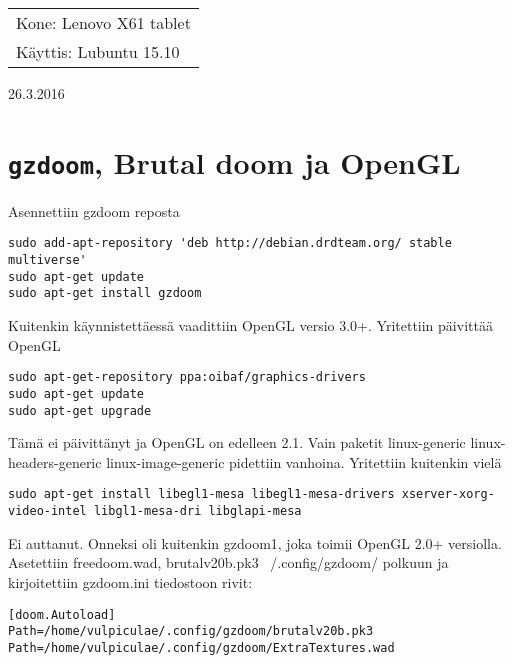 \documentclass[main.tex]{subfiles}
\begin{document}
\thispagestyle{empty}
\begin{tabular}[t]{l}
Kone: Lenovo X61 tablet\\
Käyttis: Lubuntu 15.10
\end{tabular}
\hfill 26.3.2016

\section{\texttt{gzdoom}, Brutal doom ja OpenGL}

Asennettiin gzdoom reposta

\begin{lstlisting}
sudo add-apt-repository 'deb http://debian.drdteam.org/ stable multiverse'
sudo apt-get update
sudo apt-get install gzdoom
\end{lstlisting}

Kuitenkin käynnistettäessä vaadittiin OpenGL versio 3.0+. Yritettiin päivittää OpenGL

\begin{lstlisting}
sudo apt-get-repository ppa:oibaf/graphics-drivers
sudo apt-get update
sudo apt-get upgrade
\end{lstlisting}

Tämä ei päivittänyt ja OpenGL on edelleen 2.1. Vain paketit linux-generic linux-headers-generic linux-image-generic pidettiin vanhoina. Yritettiin kuitenkin vielä

\begin{lstlisting}
sudo apt-get install libegl1-mesa libegl1-mesa-drivers xserver-xorg-video-intel libgl1-mesa-dri libglapi-mesa
\end{lstlisting}

Ei auttanut. Onneksi oli kuitenkin gzdoom1, joka toimii OpenGL 2.0+ versiolla. Asetettiin freedoom.wad, brutalv20b.pk3 ~/.config/gzdoom/ polkuun ja kirjoitettiin gzdoom.ini tiedostoon rivit:

\begin{lstlisting}
[doom.Autoload]
Path=/home/vulpiculae/.config/gzdoom/brutalv20b.pk3
Path=/home/vulpiculae/.config/gzdoom/ExtraTextures.wad
\end{lstlisting}
\end{document}
